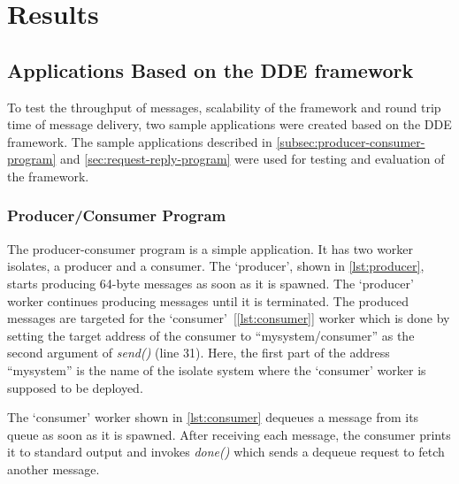 \chapter{Results}
\label{chapter:results}

\section{Applications Based on the DDE framework}
\label{sec:result-applications}
  To test the throughput of messages, scalability of the framework and round trip time of message delivery, two sample applications were created based on the DDE framework. The sample applications described in \autoref{subsec:producer-consumer-program} and
  \autoref{sec:request-reply-program} were used for testing and evaluation of the framework.

\subsection{Producer/Consumer Program}
\label{subsec:producer-consumer-program}
  The producer-consumer program is a simple application. It has two worker isolates, a producer and a consumer. The ‘producer’, shown in \autoref{lst:producer}, starts producing 64-byte messages as soon as it is spawned. The ‘producer’ worker continues producing messages until it is terminated. The produced messages are targeted for the ‘consumer’~[\autoref{lst:consumer}] worker which is done by setting the target address of the consumer to “mysystem/consumer” as the second argument of \emph{send()} (line 31). Here, the first part of the address “mysystem” is the name of the isolate system where the ‘consumer’ worker is supposed to be deployed.

  The ‘consumer’ worker shown in \autoref{lst:consumer} dequeues a message from its queue as soon as it is spawned.  After receiving each message, the consumer prints it to standard output and invokes \emph{done()} which sends a dequeue request to fetch another message.

